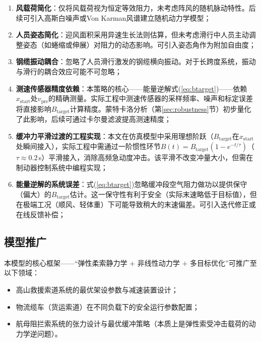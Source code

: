 \documentclass[12pt,a4paper]{ctexart}
\begin{document}
\begin{enumerate}[label=(\arabic*), leftmargin=2em]
  \item \textbf{风载荷简化}：仅将风载荷视为恒定等效阻力，未考虑阵风的随机脉动特性。后续可引入高斯白噪声或Von Karman风谱建立随机动力学模型；
  \item \textbf{人员姿态简化}：迎风面积采用异速生长法则估算，但未考虑滑行中人员主动调整姿态（如蜷缩或伸展）对阻力的动态影响。可引入姿态角作为附加自由度；
  \item \textbf{钢缆振动耦合}：忽略了人员滑行激发的钢缆横向振动。对于长跨度系统，振动与滑行的耦合效应可能不可忽略；
  \item \textbf{测速传感器精度依赖}：本策略的核心——能量逆解式(\ref{eq:btarget})——依赖$x_{\text{start}}$处$v_{\text{pre}}$的精确测量。实际工程中测速传感器的采样频率、噪声和标定误差将直接影响$B_{\text{target}}$计算精度。蒙特卡洛分析（第\ref{sec:robustness}节）初步量化了此影响，后续可通过卡尔曼滤波提高测速精度；
  \item \textbf{缓冲力平滑过渡的工程实现}：本文在仿真模型中采用理想阶跃（$B_{\text{target}}$在$x_{\text{start}}$处瞬间接入），实际工程中需通过一阶惯性环节$B(t)=B_{\text{target}}(1-e^{-t/\tau})$（$\tau\approx 0.2$\,s）平滑接入，消除高频急动度冲击。该平滑不改变冲量大小，但需在制动器控制系统中编程实现；
  \item \textbf{能量逆解的系统误差}：式(\ref{eq:btarget})忽略缓冲段空气阻力做功以提供保守（偏大）的$B_{\text{target}}$估计。这一保守性有利于安全（实际末速略低于目标值），但在极端工况（顺风、轻体重）下可能导致稍大的末速偏差。可引入迭代修正或在线反馈补偿；
\end{enumerate}

\subsection{模型推广}

本模型的核心框架——``弹性柔索静力学 $+$ 非线性动力学 $+$ 多目标优化''可推广至以下领域：

\begin{itemize}[leftmargin=2em]
  \item 高山救援索道系统的最优架设参数与减速装置设计；
  \item 物流缆车（货运索道）在不同负载下的安全运行参数配置；
  \item 航母阻拦索系统的张力设计与最优缓冲策略（本质上是弹性索受冲击载荷的动力学逆问题）。
\end{itemize}
\end{document}

